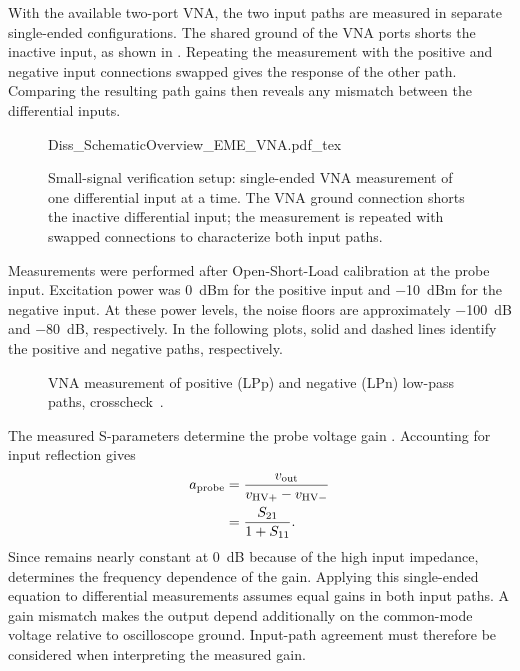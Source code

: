 With the available two-port VNA, the two input paths are measured in separate single-ended configurations.
The shared ground of the VNA ports shorts the inactive input, as shown in .
Repeating the measurement with the positive and negative input connections swapped gives the response of the other path.
Comparing the resulting path gains then reveals any mismatch between the differential inputs.

\begin{figure}[ht]
	\centering
	{Diss_SchematicOverview_EME_VNA.pdf_tex}
	\caption{Small-signal verification setup: single-ended VNA measurement of one differential input at a time. The VNA ground connection shorts the inactive differential input; the measurement is repeated with swapped connections to characterize both input paths.}\label{fig:EME_VNA_SchematicOverview}
\end{figure}

Measurements were performed after Open-Short-Load calibration at the probe input.
Excitation power was \SI{0}{dBm} for the positive input and \SI{-10}{dBm} for the negative input.
At these power levels, the noise floors are approximately \SI{-100}{dB} and \SI{-80}{dB}, respectively.
In the following plots, solid and dashed lines identify the positive and negative paths, respectively.

\begin{figure}[ht]
	\centering
	
	\caption{VNA measurement of positive (LPp) and negative (LPn) low-pass paths, crosscheck~.}\label{fig:VNA_LP}
\end{figure}

The measured S-parameters determine the probe voltage gain .
Accounting for input reflection gives
\begin{align}
	{a}_{\mathrm{probe}} 	&= \frac{{v}_{\mathrm{out}}}{{v}_{\mathrm{HV+}}-{v}_{\mathrm{HV-}}} \\
					&= \frac{{S}_{\mathrm{21}}}{1 + {S}_{\mathrm{11}}}.
\label{eq:TF_probe}
\end{align}
Since  remains nearly constant at \SI{0}{dB} because of the high input impedance,  determines the frequency dependence of the gain.
Applying this single-ended equation to differential measurements assumes equal gains in both input paths.
A gain mismatch makes the output depend additionally on the common-mode voltage relative to oscilloscope ground.
Input-path agreement must therefore be considered when interpreting the measured gain.



